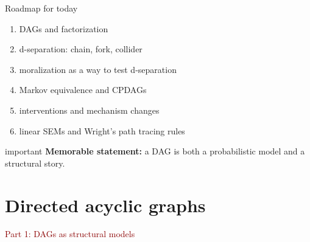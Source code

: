 \documentclass[dvipsnames,aspectratio=169,handout]{beamer}
\begin{document}
\begin{frame}{Roadmap for today}
\begin{enumerate}
    \item DAGs and factorization
    \item d-separation: chain, fork, collider
    \item moralization as a way to test d-separation
    \item Markov equivalence and CPDAGs
\item interventions and mechanism changes
    \item linear SEMs and Wright's path tracing rules
\end{enumerate}

\vspace{2mm}
\begin{beamercolorbox}[wd=\textwidth,sep=7pt,center,rounded=true,shadow=true]{important}
\textbf{Memorable statement:}
a DAG is both a probabilistic model and a structural story.
\end{beamercolorbox}
\end{frame}


\section{Directed acyclic graphs}

\begin{frame}{}
\begin{center}
{\Huge \textcolor{DarkRed}{Part 1: DAGs as structural models}}
\end{center}
\end{frame}
\end{document}
